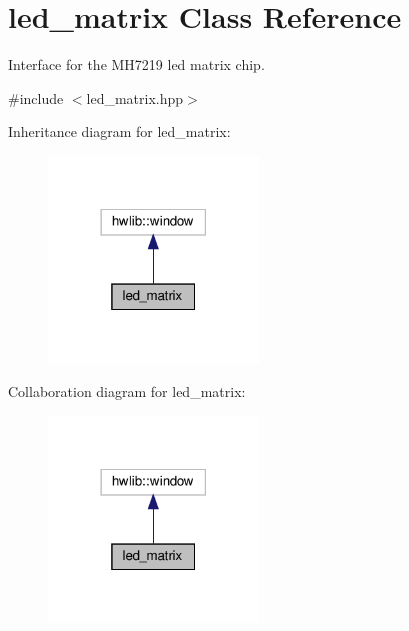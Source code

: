 \hypertarget{classled__matrix}{}\section{led\+\_\+matrix Class Reference}
\label{classled__matrix}


Interface for the M\+H7219 led matrix chip.  




{\ttfamily \#include $<$led\+\_\+matrix.\+hpp$>$}



Inheritance diagram for led\+\_\+matrix\+:
\nopagebreak
\begin{figure}[H]
\begin{center}
\leavevmode
\includegraphics[width=158pt]{classled__matrix__inherit__graph}
\end{center}
\end{figure}


Collaboration diagram for led\+\_\+matrix\+:
\nopagebreak
\begin{figure}[H]
\begin{center}
\leavevmode
\includegraphics[width=158pt]{classled__matrix__coll__graph}
\end{center}
\end{figure}
